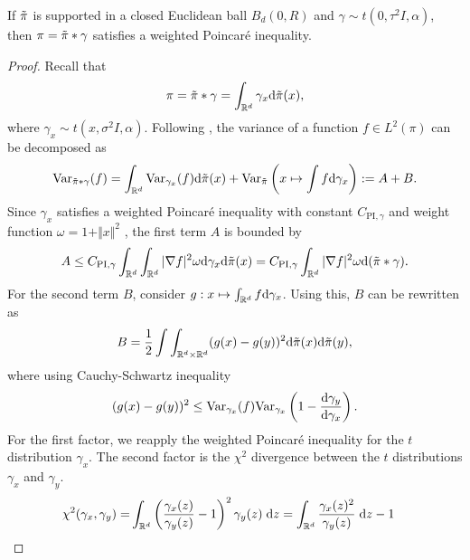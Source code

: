 \begin{lemma}\label{lemma:wegihted_pi}
    If $\Tilde{\pi}$ is supported in a closed Euclidean ball $B_d(0, R)$ and $\gamma\sim t(0, \tau^2 I, \alpha)$, then $\pi= \Tilde{\pi}*\gamma$ satisfies a weighted Poincaré inequality.
\end{lemma}
\begin{proof}
Recall that
\begin{equation*}
    \pi = \Tilde{\pi}*\gamma = \int_{\mathbb{R}^d} \gamma_{x}\mathrm{d} \Tilde{\pi}(x),
\end{equation*}
where $\gamma_x\sim t(x, \sigma^2I, \alpha)$.
Following \cite{functional_inequalities_compactly_supported_assumption}, the variance of a function $f\in L^2(\pi)$ can be decomposed as
\begin{equation*}
    \text{Var}_{\Tilde{\pi}*\gamma}(f) = \int_{\mathbb{R}^d} \text{Var}_{\gamma_x}(f)\mathrm{d} \Tilde{\pi}(x) + \text{Var}_{\Tilde{\pi}}\left(x\mapsto\int f \mathrm{d} \gamma_x\right):= A+B.
\end{equation*}
Since $\gamma_x$ satisfies a weighted Poincaré inequality with constant $C_{\text{PI}, \gamma}$ and weight function $\omega = 1 + \Vert x\Vert^2$ \citep[Proposition 2.17]{heavy_tail_functional_inequalities}, the first term $A$ is bounded by
\begin{equation*}
    A\leq C_{\text{PI}, \gamma}\int_{\mathbb{R}^d}\int_{\mathbb{R}^d}\vert\nabla f\vert^2 \omega \mathrm{d} \gamma_x\mathrm{d}\Tilde{\pi}(x) = C_{\text{PI}, \gamma}\int_{\mathbb{R}^d} \vert\nabla f\vert^2 \omega \mathrm{d}(\Tilde{\pi}*\gamma).
\end{equation*}
For the second term $B$, consider $g:x\mapsto\int_{\mathbb{R}^d} f \mathrm{d} \gamma_x$. Using this, $B$ can be rewritten as
\begin{equation*}
    B=\frac{1}{2} \int\int_{\mathbb{R}^d\times\mathbb{R}^d}(g(x)-g(y))^2\mathrm{d}\Tilde{\pi}(x)\mathrm{d}\Tilde{\pi}(y),
\end{equation*}
where using Cauchy-Schwartz inequality
\begin{equation*}
    (g(x)-g(y))^2 \leq \text{Var}_{\gamma_x}(f)\text{Var}_{\gamma_x}\left(1-\frac{\mathrm{d} \gamma
_y}{\mathrm{d}\gamma_x}\right).
\end{equation*}
For the first factor, we reapply the weighted Poincaré inequality for the $t$ distribution $\gamma_x$. The second factor is the $\chi^2$ divergence between the $t$ distributions $\gamma_x$ and $\gamma_y$.
\begin{align*}
    \chi^2(\gamma_x, \gamma_y)=& \int_{\mathbb{R}^d} \left(\frac{\gamma_x(z)}{\gamma_y(z)}-1\right)^2\gamma_y(z)\;\md z=  \int_{\mathbb{R}^d} \frac{\gamma_x(z)^2}{\gamma_y(z)}\;\md z-1

\end{align*}
\end{proof}

